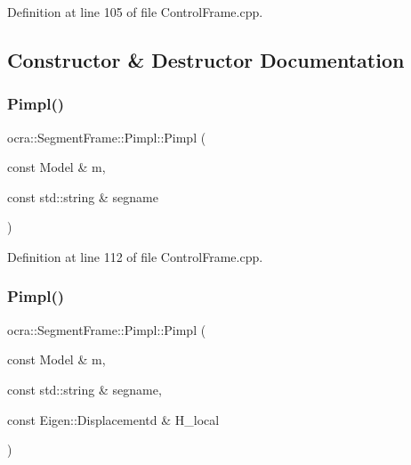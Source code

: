 Definition at line 105 of file Control\+Frame.\+cpp.



\subsection{Constructor \& Destructor Documentation}
\hypertarget{structocra_1_1SegmentFrame_1_1Pimpl_a3e4a372b7ffde0baf617f8097a4d9285}{}\label{structocra_1_1SegmentFrame_1_1Pimpl_a3e4a372b7ffde0baf617f8097a4d9285} 
\subsubsection{\texorpdfstring{Pimpl()}{Pimpl()}\hspace{0.1cm}{\footnotesize\ttfamily [1/4]}}
{\footnotesize\ttfamily ocra\+::\+Segment\+Frame\+::\+Pimpl\+::\+Pimpl (\begin{DoxyParamCaption}\item[{const Model \&}]{m,  }\item[{const std\+::string \&}]{segname }\end{DoxyParamCaption})\hspace{0.3cm}{\ttfamily [inline]}}



Definition at line 112 of file Control\+Frame.\+cpp.

\hypertarget{structocra_1_1SegmentFrame_1_1Pimpl_a419d287d9da1582ff94dd9c3ab539f2b}{}\label{structocra_1_1SegmentFrame_1_1Pimpl_a419d287d9da1582ff94dd9c3ab539f2b} 
\subsubsection{\texorpdfstring{Pimpl()}{Pimpl()}\hspace{0.1cm}{\footnotesize\ttfamily [2/4]}}
{\footnotesize\ttfamily ocra\+::\+Segment\+Frame\+::\+Pimpl\+::\+Pimpl (\begin{DoxyParamCaption}\item[{const Model \&}]{m,  }\item[{const std\+::string \&}]{segname,  }\item[{const Eigen\+::\+Displacementd \&}]{H\+\_\+local }\end{DoxyParamCaption})\hspace{0.3cm}{\ttfamily [inline]}}



